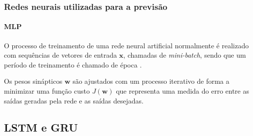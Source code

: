 \documentclass[aspectratio=169]{beamer}
\begin{document}
\begin{frame}
\frametitle{Redes neurais utilizadas para a previsão}
\framesubtitle{MLP}
\justifying O processo de treinamento de uma rede neural artificial normalmente é realizado com sequências de vetores de entrada $\mathbf{x}$, chamadas de \textit{mini-batch}, sendo que um período de treinamento é chamado de época \cite{geron2019hands}. 

Os pesos sinápticos $\textbf{w}$ são ajustados com um processo iterativo de forma a minimizar uma função custo $J(\textbf{w})$ que representa uma medida do erro entre as saídas geradas pela rede e as saídas desejadas. 
\end{frame}

\subsection{LSTM e GRU}
\end{document}
